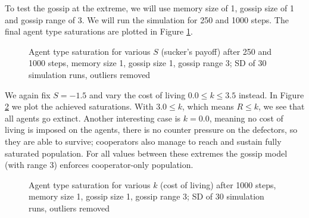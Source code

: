\documentclass[english]{article}
\begin{document}
To test the gossip at the extreme, we will use memory size of 1, gossip size of 1 and gossip range of 3.
We will run the simulation for 250 and 1000 steps.
The final agent type saturations are plotted in Figure \ref{fig:agent_sat/S_final}.

\begin{figure}[!h]
  \centering
  \caption{Agent type saturation for various $S$ (sucker's payoff) after 250 and 1000 steps, memory size 1, gossip size 1, gossip range 3; SD of 30 simulation runs, outliers removed}
  \label{fig:agent_sat/S_final}
\end{figure}

We again fix $S = -1.5$ and vary the cost of living $0.0 \leq k \leq 3.5$ instead.
In Figure \ref{fig:agent_sat/k_final} we plot the achieved saturations.
With $3.0 \leq k$, which means $R \leq k$, we see that all agents go extinct.
Another interesting case is $k = 0.0$, meaning no cost of living is imposed on the agents,
there is no counter pressure on the defectors, so they are able to survive; cooperators also manage to reach and sustain fully saturated population.
For all values between these extremes the gossip model (with range 3) enforces cooperator-only population.

\begin{figure}[!h]
  \centering
  \caption{Agent type saturation for various $k$ (cost of living) after 1000 steps, memory size 1, gossip size 1, gossip range 3; SD of 30 simulation runs, outliers removed}
  \label{fig:agent_sat/k_final}
\end{figure}
\end{document}
